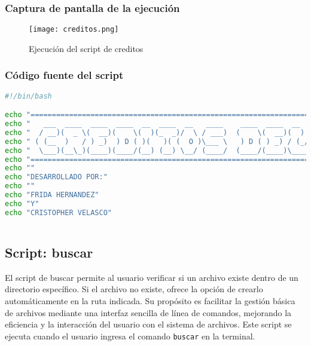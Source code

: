 \documentclass{article}
\begin{document}
\subsubsection{Captura de pantalla de la ejecución}

\begin{figure}[h!]
\centering
\texttt{[image: creditos.png]}
\caption{Ejecución del script de creditos}
\end{figure}

\subsubsection{Código fuente del script}

\begin{lstlisting}[language=bash]
#!/bin/bash

echo "=================================================================================================================="
echo "   ___  ____  ____  ____  __  ____  __   ____    ____  ____  __      ____  ____   __  _  _  ____  ___  ____  __  "
echo "  / __)(  _ \(  __)(    \(  )(_  _)/  \ / ___)  (    \(  __)(  )    (  _ \(  _ \ /  \( \/ )(  __)/ __)(_  _)/  \ " 
echo " ( (__  )   / ) _)  ) D ( )(   )( (  O )\___ \   ) D ( ) _) / (_/\   ) __/ )   /(  O ))  /  ) _)( (__   )( (  O ) "
echo "  \___)(__\_)(____)(____/(__) (__) \__/ (____/  (____/(____)\____/  (__)  (__\_) \__/(__/  (____)\___) (__) \__/  "
echo "=================================================================================================================="
echo ""
echo "DESARROLLADO POR:"
echo ""
echo "FRIDA HERNANDEZ"
echo "Y"
echo "CRISTOPHER VELASCO"
               
\end{lstlisting}

\pagebreak
\subsection{Script: buscar}

El script de buscar permite al usuario verificar si un archivo existe dentro de un directorio específico.
Si el archivo no existe, ofrece la opción de crearlo automáticamente en la ruta indicada.
Su propósito es facilitar la gestión básica de archivos mediante una interfaz sencilla de línea de comandos, mejorando la eficiencia y la interacción del usuario con el sistema de archivos. 
Este script se ejecuta cuando el usuario ingresa el comando \texttt{buscar} en la terminal.
\end{document}
